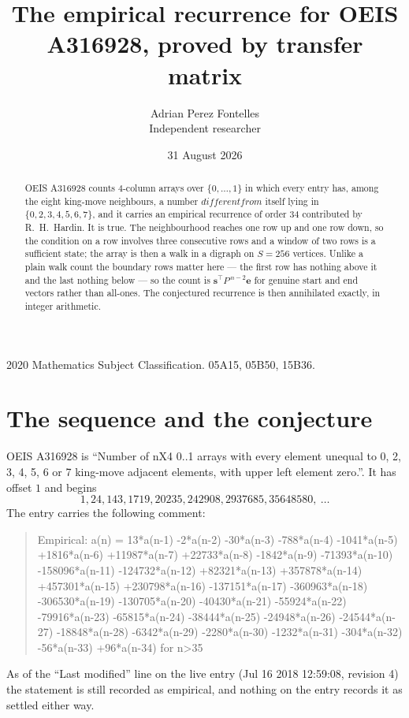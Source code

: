 \documentclass[11pt,a4paper]{article}
\title{The empirical recurrence for OEIS A316928, proved by transfer matrix}
\author{Adrian Perez Fontelles\\ \small Independent researcher}
\date{31 August 2026}
\theoremstyle{plain}
\theoremstyle{definition}
\begin{document}
\maketitle

\begin{abstract}
OEIS A316928 counts $4$-column arrays over $\{0,\dots,1\}$ in which every entry has,
among the eight king-move neighbours, a number $different from$ itself lying in $\{0,2,3,4,5,6,7\}$, and it carries an empirical
recurrence of order $34$ contributed by R.~H.~Hardin. It is true. The neighbourhood
reaches one row up and one row down, so the condition on a row involves three consecutive
rows and a window of two rows is a sufficient state; the array is then a walk in a digraph
on $S=256$ vertices. Unlike a plain walk count the boundary rows matter here --- the first
row has nothing above it and the last nothing below --- so the count is
$\mathbf{s}^{\!\top}P^{\,n-2}\mathbf{e}$ for genuine start and end vectors rather than
all-ones. The conjectured recurrence is then annihilated exactly, in integer arithmetic.
\end{abstract}

\noindent\small 2020 Mathematics Subject Classification. 05A15, 05B50, 15B36.\normalsize

\section{The sequence and the conjecture}

OEIS A316928 is ``Number of nX4 0..1 arrays with every element unequal to 0, 2, 3, 4, 5, 6 or 7 king-move adjacent elements, with upper left element zero.''. It has offset
$1$ and begins
\[
1, 24, 143, 1719, 20235, 242908, 2937685, 35648580,\ \dots
\]
The entry carries the following comment:
\begin{quote}\small
Empirical: a(n) = 13*a(n-1) -2*a(n-2) -30*a(n-3) -788*a(n-4) -1041*a(n-5) +1816*a(n-6) +11987*a(n-7) +22733*a(n-8) -1842*a(n-9) -71393*a(n-10) -158096*a(n-11) -124732*a(n-12) +82321*a(n-13) +357878*a(n-14) +457301*a(n-15) +230798*a(n-16) -137151*a(n-17) -360963*a(n-18) -306530*a(n-19) -130705*a(n-20) -40430*a(n-21) -55924*a(n-22) -79916*a(n-23) -65815*a(n-24) -38444*a(n-25) -24948*a(n-26) -24544*a(n-27) -18848*a(n-28) -6342*a(n-29) -2280*a(n-30) -1232*a(n-31) -304*a(n-32) -56*a(n-33) +96*a(n-34) for n>35
\end{quote}
As of the ``Last modified'' line on the live entry (Jul 16 2018 12:59:08, revision
4) the statement is still recorded as empirical, and nothing on the entry
records it as settled either way.
\end{document}
